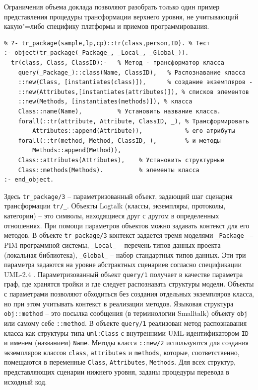 \documentclass[12pt]{article}
\begin{document}
Ограничения объема доклада позволяют разобрать только один пример представления процедуры трансформации верхнего уровня, не учитывающий какую"=либо специфику платформы и приемов программирования.
\begin{verbatim}
% ?- tr_package(sample,lp,cp)::tr(class,person,ID). % Тест
:- object(tr_package(_Package_, _Local_, _Global_)).
  tr(class, Class, ClassID):-   % Метод - трансформатор класса
    query(_Package_)::class(Name, ClassID),   % Распознавание класса
    ::new(Class, [instantiates(class)]),      % создание экземпляров -
    ::new(Attributes,[instantiates(attributes)]), % списков элементов
    ::new(Methods, [instantiates(methods)]), % класса
    Class::name(Name),          % Установить название класса.
    forall(::tr(attribute, Attribute, ClassID, _), % Трансформировать
        Attributes::append(Attribute)),            % его атрибуты
    forall(::tr(method, Method, ClassID,_),        % и методы
        Methods::append(Method)),
    Class::attributes(Attributes),    % Установить структурные
    Class::methods(Methods).          % элементы класса
:- end_object.
\end{verbatim}

Здесь \texttt{tr\_package/3} -- параметризованный объект, задающий шаг сценария трансформации \texttt{tr/\_}.  Объекты Logtalk (классы, экземпляры, протоколы, категории) -- это символы, находящиеся друг с другом в определенных отношениях.  При помощи параметров объектов можно задавать контекст для его методов.  В объекте \texttt{tr\_package/3} контекст задается тремя моделями \texttt{\_Package\_} -- PIM программной системы, \texttt{\_Local\_} -- перечень типов данных проекта (локальная библиотека), \texttt{\_Global\_} -- набор стандартных типов данных.  Эти три параметра задаются на уровне абстрактных сценариев согласно спецификации UML-2.4 \cite{GT}.  Параметризованный объект \texttt{query/1} получает в качестве параметра граф, где хранятся тройки и где следует распознавать структуры модели.  Объекты с параметрами позволяют обходиться без создания отдельных экземпляров класса, но при этом учитывать контекст в реализации методов.  Языковая структура \texttt{obj::method} -- это посылка сообщения (в терминологии Smalltalk) объекту \texttt{obj} или самому себе \texttt{::method}.  В объекте \texttt{query/1} реализован метод распознавания класса как структуры типа \texttt{uml:Class} с внутренними UML-идентификатором \texttt{ID} и именем (названием) \texttt{Name}.  Методы класса \texttt{::new/2} используются для создания экземпляров классов \texttt{class}, \texttt{attributes} и \texttt{methods}, которые, соответственно, помещаются в переменные \texttt{Class}, \texttt{Attributes}, \texttt{Methods}.  Для всех структур, представляющих сценарии нижнего уровня, заданы процедуры перевода в исходный код.
\end{document}
